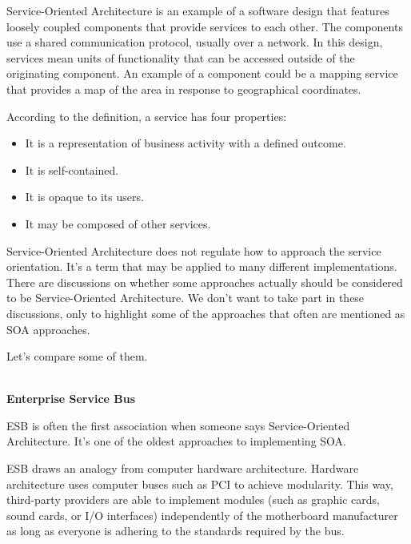 
Service-Oriented Architecture is an example of a software design that features loosely coupled components that provide services to each other. The components use a shared communication protocol, usually over a network. In this design, services mean units of functionality that can be accessed outside of the originating component. An example of a component could be a mapping service that provides a map of the area in response to geographical coordinates.

According to the definition, a service has four properties:

\begin{itemize}
\item 
It is a representation of business activity with a defined outcome.

\item 
It is self-contained.

\item 
It is opaque to its users.

\item 
It may be composed of other services.
\end{itemize}


Service-Oriented Architecture does not regulate how to approach the service orientation. It's a term that may be applied to many different implementations. There are discussions on whether some approaches actually should be considered to be Service-Oriented Architecture. We don't want to take part in these discussions, only to highlight some of the approaches that often are mentioned as SOA approaches.

Let's compare some of them.


\hspace*{\fill} \\ %
\noindent
\textbf{Enterprise Service Bus}

ESB is often the first association when someone says Service-Oriented Architecture. It's one of the oldest approaches to implementing SOA.

ESB draws an analogy from computer hardware architecture. Hardware architecture uses computer buses such as PCI to achieve modularity. This way, third-party providers are able to implement modules (such as graphic cards, sound cards, or I/O interfaces) independently of the motherboard manufacturer as long as everyone is adhering to the standards required by the bus.

